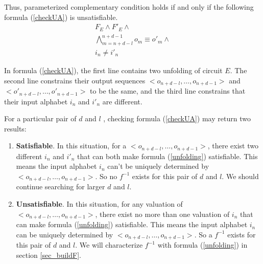 \documentclass[journal]{IEEEtran}
\begin{document}
Thus,
parameterized complementary condition holds if and only if the following formula (\ref{checkUA}) is unsatisfiable.
\begin{equation}\label{checkUA}
\begin{array}{c}
F_E \wedge F'_E\wedge \\
\bigwedge_{m=n+d-l}^{n+d-1}o_m\equiv o'_m\wedge \\
i_n\ne i'_n
\end{array}
\end{equation}

In formula (\ref{checkUA}),
the first line contains two unfolding of circuit $E$.
The second line constrains their output sequences $<o_{n+d-l},\dots , o_{n+d-1} >$ and $<o'_{n+d-l},\dots , o'_{n+d-1} >$ to be the same,
and the third line constrains that their input alphabet $i_n$ and $i'_n$ are different.

For a particular pair of $d$ and $l$ , checking formula (\ref{checkUA}) may return two results:
\begin{enumerate}
\item \textbf{Satisfiable}. In this situation,
      for a $<o_{n+d-l},\dots , o_{n+d-1} >$,
      there exist two different $i_n$ and $i'_n$ that can both make formula (\ref{unfolding}) satisfiable.
      This means the input alphabet $i_n$ can't be uniquely determined by $<o_{n+d-l},\dots , o_{n+d-1} >$.
      So no $f^{-1}$ exists for this pair of $d$ and $l$.
      We should continue searching for larger $d$ and $l$.
\item \textbf{Unsatisfiable}. In this situation,
      for any valuation of $<o_{n+d-l},\dots , o_{n+d-1} >$,
      there exist no more than one valuation of $i_n$ that can make formula (\ref{unfolding}) satisfiable.
      This means the input alphabet $i_n$ can be uniquely determined by $<o_{n+d-l},\dots , o_{n+d-1} >$.
      So a $f^{-1}$ exists for this pair of $d$ and $l$.
      We will characterize $f^{-1}$ with formula (\ref{unfolding}) in section \ref{sec_buildF}.
\end{enumerate}
\end{document}
